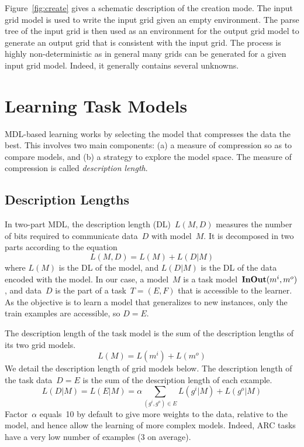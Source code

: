 \documentclass[a4paper]{llncs}
\begin{document}
Figure~\ref{fig:create} gives a schematic description of the creation
mode. The input grid model is used to write the input grid given an
empty environment. The parse tree of the input grid is then used as an
environment for the output grid model to generate an output grid that
is consistent with the input grid. The process is highly
non-deterministic as in general many grids can be generated for a
given input grid model. Indeed, it generally contains several unknowns.


\section{Learning Task Models}
\label{learning}

MDL-based learning works by selecting the model that compresses the
data the best. This involves two main components: (a) a measure of
compression so as to compare models, and (b) a strategy to explore the
model space. The measure of compression is called {\em description
  length}.

\subsection{Description Lengths}
\label{dl}

In two-part MDL, the description length (DL)~$L(M,D)$ measures the number
of bits required to communicate data~$D$ with model~$M$. It is
decomposed in two parts according to the equation
\[ L(M,D) = L(M) + L(D|M) \] where $L(M)$ is the DL of the model, and
$L(D|M)$ is the DL of the data encoded with the model.
%
In our case, a model~$M$ is a task model~${\bf InOut}(m^i,m^o)$, and
data~$D$ is the part of a task~$T = (E,F)$ that is accessible to
the learner. As the objective is to learn a model that generalizes to
new instances, only the train examples are accessible, so
$D = E$.

The description length of the task model is the sum of the description
lengths of its two grid models.
\[ L(M) = L(m^i) + L(m^o) \]
%
We detail the description length of grid models below. The
description length of the task data~$D = E$ is the sum of the
description length of each example.
\[ L(D|M) = L(E|M) = \alpha \sum_{(g^i,g^o) \in E} L(g^i|M) + L(g^o|M) \]
%
Factor~$\alpha$ equals~10 by default to give more weights to the data,
relative to the model, and hence allow the learning of more complex
models. Indeed, ARC tasks have a very low number of examples (3 on
average).
\end{document}
